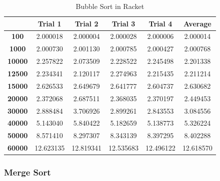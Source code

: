 \documentclass[]{report}
\begin{document}
		 		\begin{table}[H]  
  				  \centering
  				  \caption{Bubble Sort in Racket}
		 		  \begin{tabular}{cccccc}
			 		\toprule
		 		         & \textbf{Trial 1} & \textbf{Trial 2} & \textbf{Trial 3} & \textbf{Trial 4} & \textbf{Average} \\ \midrule
		 		    \textbf{100}   & 2.000018 & 2.000004 & 2.000028 & 2.000006 & 2.000014   \\
		 		    \textbf{1000}  & 2.000730 & 2.001130 & 2.000785 & 2.000427 & 2.000768   \\
		 		    \textbf{10000} & 2.257822 & 2.073509 & 2.228522 & 2.245498 & 2.201338   \\
		 		    \textbf{12500} & 2.234341 & 2.120117 & 2.274963 & 2.215435 & 2.211214   \\
		 		    \textbf{15000} & 2.626533 & 2.649679 & 2.641777 & 2.604737 & 2.630682   \\
		 		    \textbf{20000} & 2.372068 & 2.687511 & 2.368035 & 2.370197 & 2.449453   \\
		 		    \textbf{30000} & 2.888484 & 3.706926 & 2.899261 & 2.843553 & 3.084556   \\
		 		    \textbf{40000} & 5.143040 & 5.840422 & 5.182659 & 5.138773 & 5.326224   \\
		 		    \textbf{50000} & 8.571410 & 8.297307 & 8.343139 & 8.397295 & 8.402288   \\
		 		    \textbf{60000} & 12.623135 & 12.819341 & 12.535683 & 12.496122 & 12.618570    \\ \bottomrule
		 		  \end{tabular}
		 		\end{table}
		 		
		 		\subsubsection{Merge Sort} 	
		 		
\end{document}
